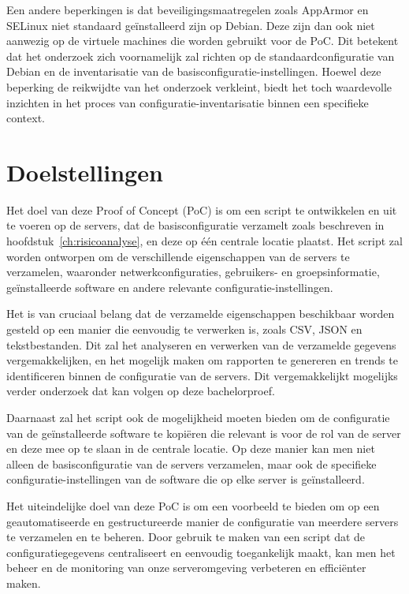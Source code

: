 Een andere beperkingen is dat beveiligingsmaatregelen zoals AppArmor en SELinux niet standaard ge\"installeerd zijn op Debian.
Deze zijn dan ook niet aanwezig op de virtuele machines die worden gebruikt voor de PoC.
Dit betekent dat het onderzoek zich voornamelijk zal richten op de standaardconfiguratie van Debian en de inventarisatie van de basisconfiguratie-instellingen.
Hoewel deze beperking de reikwijdte van het onderzoek verkleint, biedt het toch waardevolle inzichten in het proces van configuratie-inventarisatie binnen een specifieke context.

\section{Doelstellingen}
\label{poc_doelstellingen}

Het doel van deze Proof of Concept (PoC) is om een script te ontwikkelen en uit te voeren op de servers, dat de basisconfiguratie verzamelt zoals beschreven in hoofdstuk~\ref{ch:risicoanalyse}, en deze op één centrale locatie plaatst.
Het script zal worden ontworpen om de verschillende eigenschappen van de servers te verzamelen, waaronder netwerkconfiguraties, gebruikers- en groepsinformatie, ge\"installeerde software en andere relevante configuratie-instellingen.

Het is van cruciaal belang dat de verzamelde eigenschappen beschikbaar worden gesteld op een manier die eenvoudig te verwerken is, zoals CSV, JSON en tekstbestanden.
Dit zal het analyseren en verwerken van de verzamelde gegevens vergemakkelijken, en het mogelijk maken om rapporten te genereren en trends te identificeren binnen de configuratie van de servers.
Dit vergemakkelijkt mogelijks verder onderzoek dat kan volgen op deze bachelorproef.

Daarnaast zal het script ook de mogelijkheid moeten bieden om de configuratie van de ge\"installeerde software te kopi\"eren die relevant is voor de rol van de server en deze mee op te slaan in de centrale locatie.
Op deze manier kan men niet alleen de basisconfiguratie van de servers verzamelen, maar ook de specifieke configuratie-instellingen van de software die op elke server is ge\"installeerd.

Het uiteindelijke doel van deze PoC is om een voorbeeld te bieden om op een geautomatiseerde en gestructureerde manier de configuratie van meerdere servers te verzamelen en te beheren.
Door gebruik te maken van een script dat de configuratiegegevens centraliseert en eenvoudig toegankelijk maakt, kan men het beheer en de monitoring van onze serveromgeving verbeteren en effici\"enter maken.

